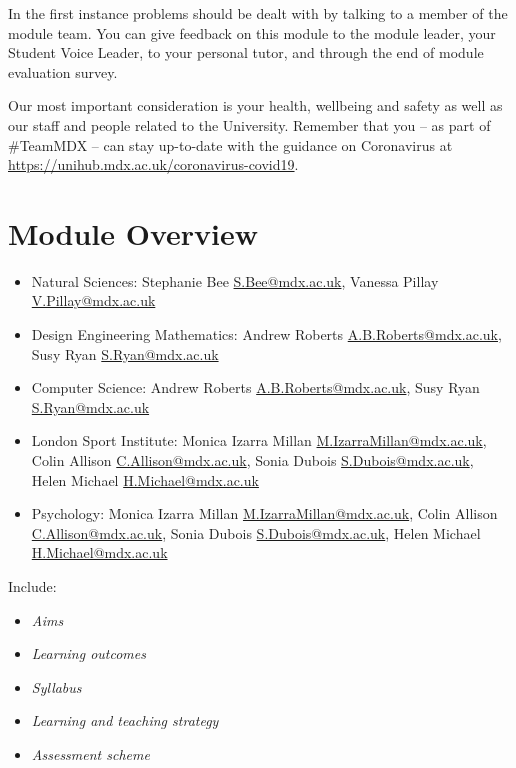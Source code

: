 \documentclass{MDXHandbook}
\begin{document}
In the first instance problems should be dealt with by talking to a member of the module team. You can give feedback on this module to the module leader, your Student Voice Leader, to your personal tutor, and through the end of module evaluation survey.

Our most important consideration is your health, wellbeing and safety as well as our staff and people related to the University. Remember that you -- as part of \#TeamMDX -- can stay up-to-date with the guidance on Coronavirus at \url{https://unihub.mdx.ac.uk/coronavirus-covid19}.


\section{Module Overview}
\begin{itemize}
	\item Natural Sciences: Stephanie Bee \href{mailto:S.Bee@mdx.ac.uk}{S.Bee@mdx.ac.uk}, Vanessa Pillay \href{mailto:V.Pillay@mdx.ac.uk}{V.Pillay@mdx.ac.uk} 
	\item Design Engineering Mathematics: Andrew Roberts \href{mailto:A.B.Roberts@mdx.ac.uk}{A.B.Roberts@mdx.ac.uk}, Susy Ryan \href{mailto:S.Ryan@mdx.ac.uk}{S.Ryan@mdx.ac.uk} 
	\item Computer Science: Andrew Roberts \href{mailto:A.B.Roberts@mdx.ac.uk}{A.B.Roberts@mdx.ac.uk}, Susy Ryan \href{mailto:S.Ryan@mdx.ac.uk}{S.Ryan@mdx.ac.uk}
	\item London Sport Institute: Monica Izarra Millan \href{mailto:M.IzarraMillan@mdx.ac.uk}{M.IzarraMillan@mdx.ac.uk}, Colin Allison \href{mailto:C.Allison@mdx.ac.uk}{C.Allison@mdx.ac.uk}, Sonia Dubois \href{mailto:S.Dubois@mdx.ac.uk}{S.Dubois@mdx.ac.uk}, Helen Michael \href{mailto:H.Michael@mdx.ac.uk}{H.Michael@mdx.ac.uk} 
	\item Psychology: Monica Izarra Millan \href{mailto:M.IzarraMillan@mdx.ac.uk}{M.IzarraMillan@mdx.ac.uk}, Colin Allison \href{mailto:C.Allison@mdx.ac.uk}{C.Allison@mdx.ac.uk}, Sonia Dubois \href{mailto:S.Dubois@mdx.ac.uk}{S.Dubois@mdx.ac.uk}, Helen Michael \href{mailto:H.Michael@mdx.ac.uk}{H.Michael@mdx.ac.uk}
\end{itemize}
Include:
\begin{itemize}
\item \emph{Aims}
\item \emph{Learning outcomes}
\item \emph{Syllabus}
\item \emph{Learning and teaching strategy}
\item \emph{Assessment scheme}
\end{itemize}
\end{document}
